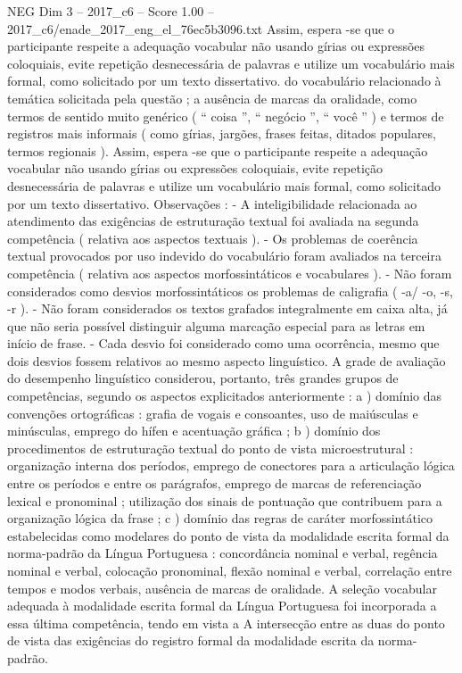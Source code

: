 \begin{textsample}{NEG Dim 3 – 2017\_c6 – Score 1.00 – 2017\_c6/enade\_2017\_eng\_el\_76ec5b3096.txt}
Assim, espera -se que o participante respeite a adequação vocabular não usando gírias ou expressões coloquiais, evite repetição desnecessária de palavras e utilize um vocabulário mais formal, como solicitado por um texto dissertativo. do vocabulário relacionado à temática solicitada pela questão ; a ausência de marcas da oralidade, como termos de sentido muito genérico ( “ coisa ”, “ negócio ”, “ você ” ) e termos de registros mais informais ( como gírias, jargões, frases feitas, ditados populares, termos regionais ).
Assim, espera -se que o participante respeite a adequação vocabular não usando gírias ou expressões coloquiais, evite repetição desnecessária de palavras e utilize um vocabulário mais formal, como solicitado por um texto dissertativo.
Observações : - A inteligibilidade relacionada ao atendimento das exigências de estruturação textual foi avaliada na segunda competência ( relativa aos aspectos textuais ). - Os problemas de coerência textual provocados por uso indevido do vocabulário foram avaliados na terceira competência ( relativa aos aspectos morfossintáticos e vocabulares ). - Não foram considerados como desvios morfossintáticos os problemas de caligrafia ( -a/ -o, -s, -r ). - Não foram considerados os textos grafados integralmente em caixa alta, já que não seria possível distinguir alguma marcação especial para as letras em início de frase. - Cada desvio foi considerado como uma ocorrência, mesmo que dois desvios fossem relativos ao mesmo aspecto linguístico.
A grade de avaliação do desempenho linguístico considerou, portanto, três grandes grupos de competências, segundo os aspectos explicitados anteriormente : a ) domínio das convenções ortográficas : grafia de vogais e consoantes, uso de maiúsculas e minúsculas, emprego do hífen e acentuação gráfica ; b ) domínio dos procedimentos de estruturação textual do ponto de vista microestrutural : organização interna dos períodos, emprego de conectores para a articulação lógica entre os períodos e entre os parágrafos, emprego de marcas de referenciação lexical e pronominal ; utilização dos sinais de pontuação que contribuem para a organização lógica da frase ; c ) domínio das regras de caráter morfossintático estabelecidas como modelares do ponto de vista da modalidade escrita formal da norma-padrão da Língua Portuguesa : concordância nominal e verbal, regência nominal e verbal, colocação pronominal, flexão nominal e verbal, correlação entre tempos e modos verbais, ausência de marcas de oralidade.
A seleção vocabular adequada à modalidade escrita formal da Língua Portuguesa foi incorporada a essa última competência, tendo em vista a A intersecção entre as duas do ponto de vista das exigências do registro formal da modalidade escrita da norma-padrão.

\end{textsample}
